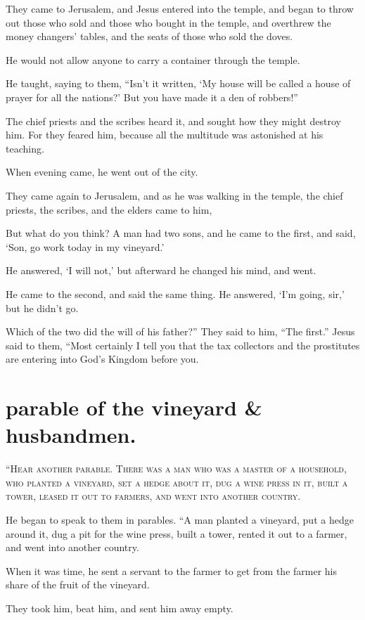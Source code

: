 They came to Jerusalem, and Jesus entered into the temple, and began to throw out those who sold and those who bought in the temple, and overthrew the money changers’ tables, and the seats of those who sold the doves.

He would not allow anyone to carry a container through the temple.

He taught, saying to them, “Isn’t it written, ‘My house will be called a house of prayer for all the nations?’ But you have made it a den of robbers!”

The chief priests and the scribes heard it, and sought how they might destroy him. For they feared him, because all the multitude was astonished at his teaching.

When evening came, he went out of the city.

They came again to Jerusalem, and as he was walking in the temple, the chief priests, the scribes, and the elders came to him,

But what do you think? A man had two sons, and he came to the first, and said, ‘Son, go work today in my vineyard.’

He answered, ‘I will not,’ but afterward he changed his mind, and went.

He came to the second, and said the same thing. He answered, ‘I’m going, sir,’ but he didn’t go.

Which of the two did the will of his father?” They said to him, “The first.” Jesus said to them, “Most certainly I tell you that the tax collectors and the prostitutes are entering into God’s Kingdom before you.


\clearpage \section*{parable of the vineyard \& husbandmen.}

\lettrine{“}{Hear another parable. There was a man who was a master of a household, who planted a vineyard, set a hedge about it, dug a wine press in it, built a tower, leased it out to farmers, and went into another country.}

He began to speak to them in parables. “A man planted a vineyard, put a hedge around it, dug a pit for the wine press, built a tower, rented it out to a farmer, and went into another country.

When it was time, he sent a servant to the farmer to get from the farmer his share of the fruit of the vineyard.

They took him, beat him, and sent him away empty.

